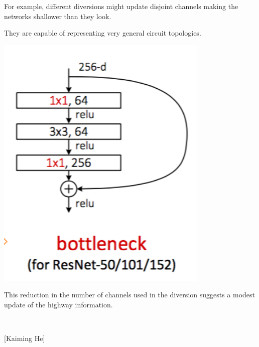 {\begin{minipage}[b]{4in}
  \bigskip
  \bigskip
  For example, different diversions might update disjoint channels making the networks shallower than they look.

  \bigskip
  \bigskip
  They are capable of representing very general circuit topologies.
\end{minipage}


\includegraphics[width= 4.0in]{../images/bottleneck}
\hfill \begin{minipage}[b]{4in} This reduction in the number of channels used in the diversion suggests a modest update of the highway information.

  ~
  \vspace{15ex}
  ~
\end{minipage}

{\large \hspace{4em} [Kaiming He]}

}
